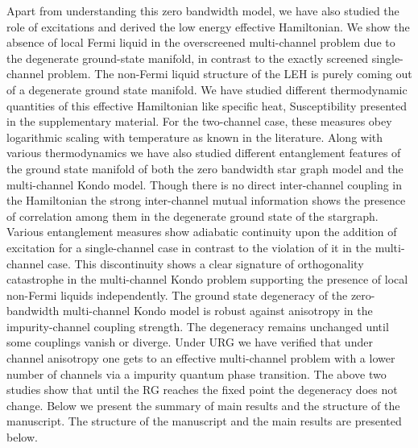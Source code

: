 \documentclass[reprint,prb,superscriptaddress]{revtex4-1}
\begin{document}
\par Apart from understanding this zero bandwidth model, we have also studied the role of excitations and derived the low energy effective Hamiltonian. We show the absence of local Fermi liquid in the overscreened multi-channel problem due to the degenerate ground-state manifold, in contrast to the exactly screened single-channel problem. The non-Fermi liquid structure of the LEH is purely coming out of a degenerate ground state manifold. We have studied different thermodynamic quantities of this effective Hamiltonian like specific heat, Susceptibility presented in the supplementary material. For the two-channel case, these measures obey logarithmic scaling with temperature as known in the literature. Along with various thermodynamics we have also studied different entanglement features of the ground state manifold of both the zero bandwidth star graph model and the multi-channel Kondo model. Though there is no direct inter-channel coupling in the Hamiltonian the strong inter-channel mutual information shows the presence of correlation among them in the degenerate ground state of the stargraph. Various entanglement measures show adiabatic continuity upon the addition of excitation for a single-channel case in contrast to the violation of it in the multi-channel case. This discontinuity shows a clear signature of orthogonality catastrophe in the multi-channel Kondo problem supporting the presence of local non-Fermi liquids independently. The ground state degeneracy of the zero-bandwidth multi-channel Kondo model is robust against anisotropy in the impurity-channel coupling strength. The degeneracy remains unchanged until some couplings vanish or diverge. Under URG we have verified that under channel anisotropy one gets to an effective multi-channel problem with a lower number of channels via a impurity quantum phase transition. The above two studies show that until the RG reaches the fixed point the degeneracy does not change. Below we present the summary of main results and the structure of the manuscript. The structure of the manuscript and the main results are presented below.
\end{document}
